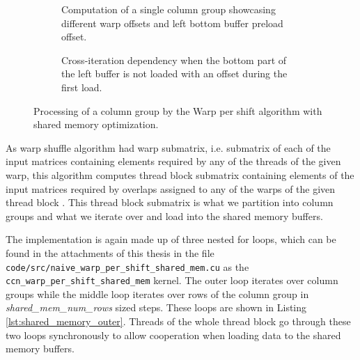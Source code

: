 \begin{figure}[ht]
	\centering	
	\begin{subfigure}{\textwidth}
		\centering
		\def\svgwidth{0.7\textwidth}
		\fontsize{8}{10}\selectfont
		
		\caption{Computation of a single column group showcasing different warp offsets and left bottom buffer preload offset.}
		\label{fig:shared_mem_buffer_iterations}
	\end{subfigure}
	\hfill
	\begin{subfigure}{\textwidth}
		\centering
		\def\svgwidth{0.7\textwidth}
		\fontsize{8}{10}\selectfont
		
		\caption{Cross-iteration dependency when the bottom part of the left buffer is not loaded with an offset during the first load.}
		\label{fig:left_buffer_no_preload}
	\end{subfigure}
	
	\caption{Processing of a column group by the Warp per shift algorithm with shared memory optimization.}
\end{figure}

As warp shuffle algorithm had warp submatrix, i.e. submatrix of each of the input matrices containing elements required by any of the threads of the given warp, this algorithm computes thread block submatrix containing elements of the input matrices required by overlaps assigned to any of the warps of the given thread block . This thread block submatrix is what we partition into column groups and what we iterate over and load into the shared memory buffers.

The implementation is again made up of three nested for loops, which can be found in the attachments of this thesis in the file \texttt{code/src/naive\_warp\_per\_shift\_shared\_mem.cu} as the \texttt{ccn\_warp\_per\_shift\_shared\_mem} kernel. The outer loop iterates over column groups while the middle loop iterates over rows of the column group in \textit{shared\_mem\_num\_rows} sized steps. These loops are shown in Listing \ref{lst:shared_memory_outer}. Threads of the whole thread block go through these two loops synchronously to allow cooperation when loading data to the shared memory buffers. 

